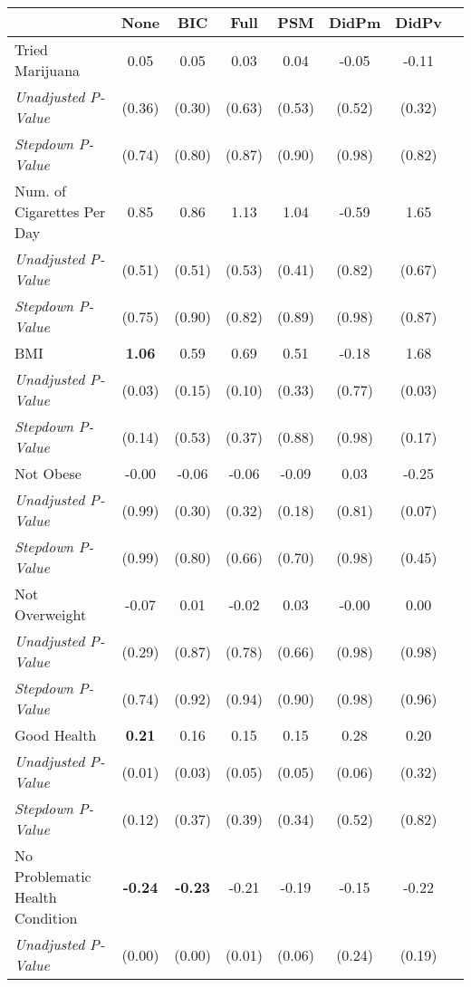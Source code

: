 \begin{tabular}{l c c c c c c c}
\toprule
 & None & BIC & Full & PSM & DidPm & DidPv \\
\midrule
Tried Marijuana & 0.05 & 0.05 & 0.03 & 0.04 & -0.05 & -0.11 \\
\quad \textit{Unadjusted P-Value} & (0.36) & (0.30) & (0.63) & (0.53) & (0.52) & (0.32) \\
\quad \textit{Stepdown P-Value} & (0.74) & (0.80) & (0.87) & (0.90) & (0.98) & (0.82) \\
Num. of Cigarettes Per Day & 0.85 & 0.86 & 1.13 & 1.04 & -0.59 & 1.65 \\
\quad \textit{Unadjusted P-Value} & (0.51) & (0.51) & (0.53) & (0.41) & (0.82) & (0.67) \\
\quad \textit{Stepdown P-Value} & (0.75) & (0.90) & (0.82) & (0.89) & (0.98) & (0.87) \\
BMI & \textbf{ 1.06 } & 0.59 & 0.69 & 0.51 & -0.18 & 1.68 \\
\quad \textit{Unadjusted P-Value} & (0.03) & (0.15) & (0.10) & (0.33) & (0.77) & (0.03) \\
\quad \textit{Stepdown P-Value} & (0.14) & (0.53) & (0.37) & (0.88) & (0.98) & (0.17) \\
Not Obese & -0.00 & -0.06 & -0.06 & -0.09 & 0.03 & -0.25 \\
\quad \textit{Unadjusted P-Value} & (0.99) & (0.30) & (0.32) & (0.18) & (0.81) & (0.07) \\
\quad \textit{Stepdown P-Value} & (0.99) & (0.80) & (0.66) & (0.70) & (0.98) & (0.45) \\
Not Overweight & -0.07 & 0.01 & -0.02 & 0.03 & -0.00 & 0.00 \\
\quad \textit{Unadjusted P-Value} & (0.29) & (0.87) & (0.78) & (0.66) & (0.98) & (0.98) \\
\quad \textit{Stepdown P-Value} & (0.74) & (0.92) & (0.94) & (0.90) & (0.98) & (0.96) \\
Good Health & \textbf{ 0.21 } & 0.16 & 0.15 & 0.15 & 0.28 & 0.20 \\
\quad \textit{Unadjusted P-Value} & (0.01) & (0.03) & (0.05) & (0.05) & (0.06) & (0.32) \\
\quad \textit{Stepdown P-Value} & (0.12) & (0.37) & (0.39) & (0.34) & (0.52) & (0.82) \\
No Problematic Health Condition & \textbf{ -0.24 } & \textbf{ -0.23 } & -0.21 & -0.19 & -0.15 & -0.22 \\
\quad \textit{Unadjusted P-Value} & (0.00) & (0.00) & (0.01) & (0.06) & (0.24) & (0.19) \\

\end{tabular}
